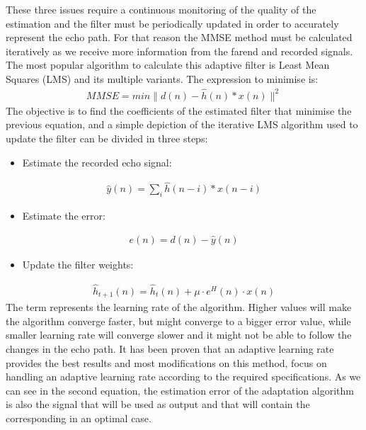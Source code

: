 \documentclass[letterpaper,10pt,english]{jupyterBook}
\begin{document}
\sphinxAtStartPar
These three issues require a continuous monitoring of the quality of the
estimation and the filter must be periodically updated in order to
accurately represent the echo path. For that reason the MMSE method must
be calculated iteratively as we receive more information from the
far\sphinxhyphen{}end and recorded signals. The most popular algorithm to calculate
this adaptive filter is Least Mean Squares (LMS) and its multiple
variants. The expression to minimise is:
\begin{equation*}
\begin{split} MMSE = min \|d(n) - \hat{h}(n)*x(n)\|^2 \end{split}
\end{equation*}
\sphinxAtStartPar
The objective is to find the coefficients of the estimated filter that
minimise the previous equation, and a simple depiction of the iterative
LMS algorithm used to update the filter can be divided in three steps:
\begin{itemize}
\item {} 
\sphinxAtStartPar
Estimate the recorded echo signal:

\end{itemize}
\begin{equation*}
\begin{split} \hat{y}(n) = \sum_{i} \hat{h}(n-i)*x(n-i) \end{split}
\end{equation*}\begin{itemize}
\item {} 
\sphinxAtStartPar
Estimate the error:

\end{itemize}
\begin{equation*}
\begin{split} e(n) = d(n) - \hat{y}(n) \end{split}
\end{equation*}\begin{itemize}
\item {} 
\sphinxAtStartPar
Update the filter weights:

\end{itemize}
\begin{equation*}
\begin{split} \hat{h}_{t+1}(n) = \hat{h}_{t}(n) + \mu \cdot e^H(n) \cdot
x(n) \end{split}
\end{equation*}
\sphinxAtStartPar
The term  represents the learning rate of the algorithm. Higher
values will make the algorithm converge faster, but might converge to a
bigger error value, while smaller learning rate will converge slower and
it might not be able to follow the changes in the echo path. It has been
proven that an adaptive learning rate provides the best results and most
modifications on this method, focus on handling an adaptive learning
rate according to the required specifications. As we can see in the
second equation, the estimation error of the adaptation algorithm is
also the signal that will be used as output and that will contain the
corresponding  in an optimal case.
\end{document}
